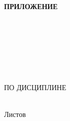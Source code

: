 \begin{ESKDtitlePage}
  \begin{flushright}
    \textbf{ПРИЛОЖЕНИЕ~\envCourseworkPrilLetter} \enspace\enspace
  \end{flushright}

  \begin{center}
    \envCourseworkEducation \\
    \envCourseworkUniversity \\
    \envCourseworkCathedra \\
  \end{center}

  \vfill

  \begin{center}
    \envCourseworkTitle \\
  \end{center}

  \vfill

  \begin{center}
    \textbf{\envCourseworkDocumentTitle} \\
    ПО ДИСЦИПЛИНЕ \envCourseworkSubject \\
  \end{center}

  \vfill

  \begin{center}
    \envCourseworkCode \\
    Листов \pageref{LastPage} \\
  \end{center}

  \vfill

  

  \vfill

  \begin{center}
    \ESKDtheYear
  \end{center}
\end{ESKDtitlePage}
